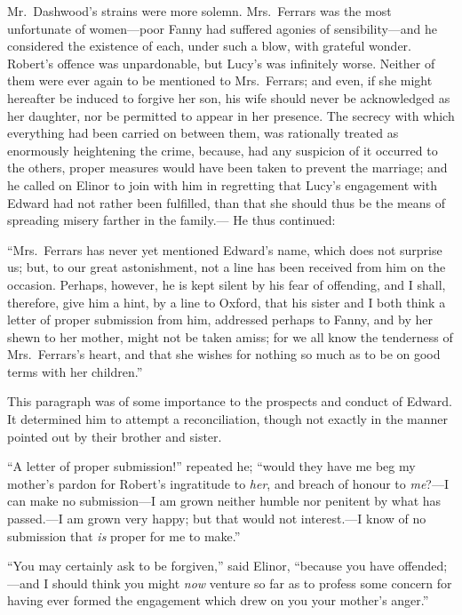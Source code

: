 \documentclass{article}
\begin{document}
Mr.\ Dashwood's strains were more solemn.
Mrs.\ Ferrars was the most unfortunate of women---poor
Fanny had suffered agonies of sensibility---and he
considered the existence of each, under such a blow,
with grateful wonder.  Robert's offence was unpardonable,
but Lucy's was infinitely worse.  Neither of them were
ever again to be mentioned to Mrs.\ Ferrars; and even,
if she might hereafter be induced to forgive her son,
his wife should never be acknowledged as her daughter,
nor be permitted to appear in her presence.  The secrecy
with which everything had been carried on between them,
was rationally treated as enormously heightening
the crime, because, had any suspicion of it occurred
to the others, proper measures would have been taken
to prevent the marriage; and he called on Elinor to join
with him in regretting that Lucy's engagement with Edward
had not rather been fulfilled, than that she should thus
be the means of spreading misery farther in the family.---%
He thus continued:

``Mrs.\ Ferrars has never yet mentioned Edward's name,
which does not surprise us; but, to our great astonishment,
not a line has been received from him on the occasion.
Perhaps, however, he is kept silent by his fear of offending,
and I shall, therefore, give him a hint, by a line
to Oxford, that his sister and I both think a letter
of proper submission from him, addressed perhaps to Fanny,
and by her shewn to her mother, might not be taken amiss;
for we all know the tenderness of Mrs.\ Ferrars's heart,
and that she wishes for nothing so much as to be on good terms
with her children.''

This paragraph was of some importance to the
prospects and conduct of Edward.  It determined him
to attempt a reconciliation, though not exactly
in the manner pointed out by their brother and sister.

``A letter of proper submission!'' repeated he;
``would they have me beg my mother's pardon for Robert's
ingratitude to \emph{her}, and breach of honour to \emph{me}?---I can
make no submission---I am grown neither humble nor
penitent by what has passed.---I am grown very happy;
but that would not interest.---I know of no submission
that \emph{is} proper for me to make.''

``You may certainly ask to be forgiven,'' said Elinor,
``because you have offended;---and I should think you
might \emph{now} venture so far as to profess some concern
for having ever formed the engagement which drew on you
your mother's anger.''
\end{document}

